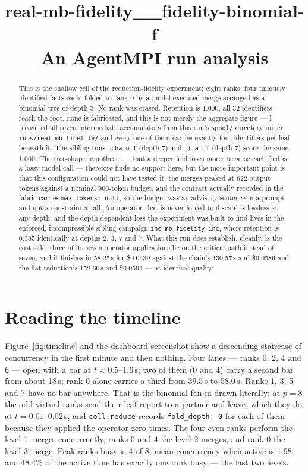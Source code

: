 \documentclass[11pt]{article}
\title{\textbf{real-mb-fidelity\_\_fidelity-binomial-f}\\[2pt]\large An AgentMPI run analysis}
\author{}
\date{}
\begin{document}
\maketitle

\begin{abstract}
This is the shallow cell of the reduction-fidelity experiment: eight ranks, four
uniquely identified facts each, folded to rank 0 by a model-executed merge arranged as
a binomial tree of depth 3. No rank was erased. Retention is 1.000, all 32 identifiers
reach the root, none is fabricated, and this is not merely the aggregate figure --- I
recovered all seven intermediate accumulators from
this run's \texttt{spool/} directory under \texttt{runs/real-mb-fidelity/} and every one of them carries
exactly four identifiers per leaf beneath it. The sibling runs \texttt{-chain-f} (depth
7) and \texttt{-flat-f} (depth 7) score the same 1.000. The tree-shape hypothesis ---
that a deeper fold loses more, because each fold is a lossy model call --- therefore
finds no support here, but the more important point is that this configuration could
not have tested it: the merges peaked at 622 output tokens against a nominal 900-token
budget, and the contract actually recorded in the fabric carries
\texttt{max\_tokens: null}, so the budget was an advisory sentence in a prompt and not
a constraint at all. An operator that is never forced to discard is lossless at any
depth, and the depth-dependent loss the experiment was built to find lives in the
enforced, incompressible sibling campaign \texttt{inc-mb-fidelity-inc}, where retention
is $0.385$ identically at depths 2, 3, 7 and 7. What this run does establish, cleanly,
is the cost side: three of its seven operator applications lie on the critical path
instead of seven, and it finishes in 58.25\,s for \$0.0439 against the chain's
130.57\,s and \$0.0586 and the flat reduction's 152.60\,s and \$0.0594 --- at
identical quality.
\end{abstract}



\section{Reading the timeline}

Figure~\ref{fig:timeline} and the dashboard screenshot show a descending staircase of
concurrency in the first minute and then nothing. Four lanes --- ranks 0, 2, 4 and 6 ---
open with a bar at $t \approx 0.5$--$1.6$\,s; two of them (0 and 4) carry a second bar
from about 18\,s; rank 0 alone carries a third from 39.5\,s to 58.0\,s. Ranks 1, 3, 5
and 7 have no bar anywhere. That is the binomial fan-in drawn literally: at $p = 8$ the
odd virtual ranks send their leaf report to a partner and leave, which they do at
$t = 0.01$--$0.02$\,s, and \texttt{coll.reduce} records \texttt{fold\_depth: 0} for each
of them because they applied the operator zero times. The four even ranks perform the
level-1 merges concurrently, ranks 0 and 4 the level-2 merges, and rank 0 the level-3
merge. Peak ranks busy is 4 of 8, mean concurrency when active is 1.98, and 48.4\% of
the active time has exactly one rank busy --- the last two levels.
\end{document}
